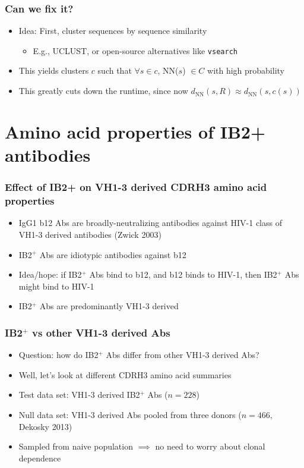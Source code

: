 \documentclass[mathserif,compress]{beamer}
\renewcommand\;{\,}
\begin{document}
\begin{frame}\frametitle{Can we fix it?}
\begin{itemize}
\item
Idea: First, cluster sequences by sequence similarity
\begin{itemize}
\smallskip
\item E.g., UCLUST, or open-source alternatives like \texttt{vsearch}
\end{itemize}
\bigskip
\item
This yields clusters $c$ such that $\forall s \in c$, NN($s$) $\in C$ with high probability
\bigskip
\item
This greatly cuts down the runtime, since now $d_\text{NN}(s, R) \approx d_\text{NN}(s, c(s))$
\end{itemize}
\end{frame}

\section{Amino acid properties of IB2+ antibodies}

\begin{frame}\frametitle{Effect of IB2+ on VH1-3 derived CDRH3 amino acid properties}
\begin{itemize}
\item
IgG1 b12 Abs are broadly-neutralizing antibodies against HIV-1
 class of VH1-3 derived antibodies (Zwick 2003)
 \bigskip
 \item
IB2$^+$ Abs are idiotypic antibodies against b12
\bigskip
\item
Idea/hope: if IB2$^+$ Abs bind to b12, and b12 binds to HIV-1, then IB2$^+$ Abs might bind to HIV-1 
\bigskip
\item
IB2$^+$ Abs are predominantly VH1-3 derived
\end{itemize}
\end{frame}

\begin{frame}\frametitle{IB2$^+$ vs other VH1-3 derived Abs}
\begin{itemize}
\item
Question: how do IB2$^+$ Abs differ from other VH1-3 derived Abs?
\bigskip
\item
Well, let's look at different CDRH3 amino acid summaries
\bigskip
\item
Test data set: VH1-3 derived IB2$^+$ Abs ($n = 228$)
\bigskip
\item
Null data set: VH1-3 derived Abs pooled from three donors ($n = 466$, Dekosky 2013)
\bigskip
\item
Sampled from naive population $\implies $ no need to worry about clonal dependence 
\end{itemize}
\end{frame}
\end{document}

